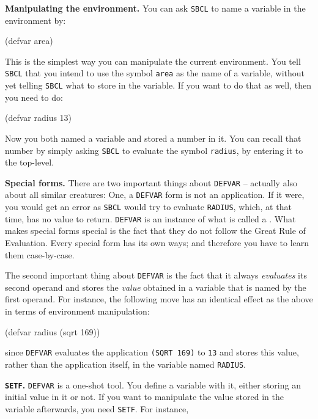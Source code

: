 \documentclass[a4paper,11pt]{article}
\begin{document}
\begin{uenum}
\item {\bf Manipulating the environment.} You can ask \Verb+SBCL+ to name a variable in the environment by:

\begin{lispcode}
(defvar area)
\end{lispcode}

This is the simplest way you can manipulate the current environment. You tell \Verb+SBCL+ that you intend to use the symbol \Verb+area+ as the name of a variable, without yet telling \Verb+SBCL+ what to store in the variable.  If you want to do that as well, then you need to do:

\begin{lispcode}
(defvar radius 13)
\end{lispcode}

Now you both named a variable and stored a number in it. You can recall that number by simply asking \Verb+SBCL+ to evaluate the symbol \Verb+radius+, by entering it to the top-level.

\item {\bf Special forms.}
There are two important things about \Verb+DEFVAR+ -- actually also about all similar creatures: One, a \Verb+DEFVAR+ form is not an application. If it were, you would get an error as \Verb+SBCL+ would try to evaluate \Verb+RADIUS+, which, at that time, has no value to return. \Verb+DEFVAR+ is an instance of what is called a . What makes special forms special is the fact that they do not follow the Great Rule of Evaluation. Every special form has its own ways; and therefore you have to learn them case-by-case.

The second important thing about \Verb+DEFVAR+ is the fact that it always \emph{evaluates} its second operand and stores the \emph{value} obtained in a variable that is named by the first operand. For instance, the following move has an identical effect as the above in terms of environment manipulation:

\begin{lispcode}
(defvar radius (sqrt 169))
\end{lispcode}

since \Verb+DEFVAR+ evaluates the application \Verb+(SQRT 169)+ to \Verb+13+ and stores this value, rather than the application itself, in the variable named \Verb+RADIUS+.

\item {\bf \Verb+SETF+.} \Verb+DEFVAR+ is a one-shot tool. You define a variable with it, either storing an initial value in it or not. If you want to manipulate the value stored in the variable afterwards, you need \Verb+SETF+. For instance,


\end{uenum}
\end{document}
